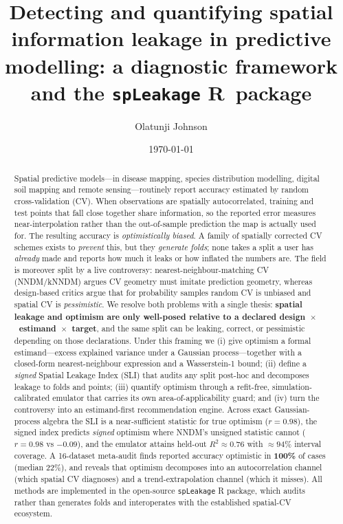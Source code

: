 \documentclass[11pt,a4paper]{article}
\title{\bfseries Detecting and quantifying spatial information leakage in
predictive modelling: a diagnostic framework and the \texttt{spLeakage}
R~package}
\author[1]{Olatunji Johnson}
\affil[1]{Department of Mathematics, University of Manchester, Manchester, UK\\
\texttt{olatunji.johnson@manchester.ac.uk}}
\date{\today}
\begin{document}
\maketitle
\linenumbers

\begin{abstract}
\noindent
Spatial predictive models---in disease mapping, species distribution modelling,
digital soil mapping and remote sensing---routinely report accuracy estimated by
random cross-validation (CV). When observations are spatially autocorrelated,
training and test points that fall close together share information, so the
reported error measures near-interpolation rather than the out-of-sample
prediction the map is actually used for. The resulting accuracy is
\emph{optimistically biased}. A family of spatially corrected CV schemes exists to
\emph{prevent} this, but they \emph{generate folds}; none takes a split a user has
\emph{already} made and reports how much it leaks or how inflated the numbers are.
The field is moreover split by a live controversy: nearest-neighbour-matching CV
(NNDM/kNNDM) argues CV geometry must imitate prediction geometry, whereas
design-based critics argue that for probability samples random CV is unbiased and
spatial CV is \emph{pessimistic}.
We resolve both problems with a single thesis: \textbf{spatial leakage and
optimism are only well-posed relative to a declared
design~$\times$~estimand~$\times$~target}, and the same split can be leaking,
correct, or pessimistic depending on those declarations. Under this framing we
(i) give optimism a formal estimand---excess explained variance under a Gaussian
process---together with a closed-form nearest-neighbour expression and a
Wasserstein-1 bound; (ii) define a \emph{signed} Spatial Leakage Index (SLI) that
audits any split post-hoc and decomposes leakage to folds and points; (iii)
quantify optimism through a refit-free, simulation-calibrated emulator that carries
its own area-of-applicability guard; and (iv) turn the controversy into an
estimand-first recommendation engine. Across exact Gaussian-process algebra the SLI
is a near-sufficient statistic for true optimism ($r=0.98$), the signed index
predicts \emph{signed} optimism where NNDM's unsigned statistic cannot
($r=0.98$ vs $-0.09$), and the emulator attains held-out $R^2\approx0.76$ with
$\approx94\%$ interval coverage. A 16-dataset meta-audit finds reported accuracy
optimistic in \textbf{100\%} of cases (median 22\%), and reveals that optimism
decomposes into an autocorrelation channel (which spatial CV diagnoses) and a
trend-extrapolation channel (which it misses). All methods are implemented in the
open-source \texttt{spLeakage} R package, which audits rather than generates folds
and interoperates with the established spatial-CV ecosystem.
\end{abstract}
\end{document}
